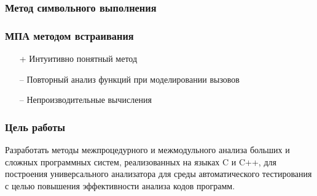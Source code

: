 \documentclass[hyperref={pdfpagelabels=false}]{beamer}
\begin{document}
\begin{frame}
\frametitle{Метод символьного выполнения}
\begin{figure}[h]
\end{figure}
\end{frame}

\begin{frame}
\frametitle{МПА методом встраивания}
\begin{itemize}
 \item[+] Интуитивно понятный метод
 \item[--] Повторный анализ функций при моделировании вызовов
 \item[--] Непроизводительные вычисления
\end{itemize}
\end{frame}

\begin{frame}
\frametitle{Цель работы}
Разработать методы межпроцедурного и межмодульного анализа больших и сложных программных систем, реализованных на языках C и C++, для построения универсального анализатора для среды автоматического тестирования с целью повышения эффективности анализа кодов программ.
\end{frame}
\end{document}
